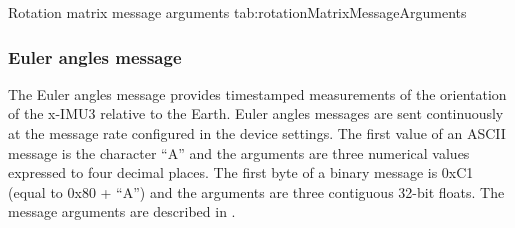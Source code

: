 \begingroup
    \def\tempArgumentA{Rotation matrix XX element}
    \def\tempArgumentB{Rotation matrix XY element}
    \def\tempArgumentC{Rotation matrix XZ element}
    \def\tempArgumentD{Rotation matrix YX element}
    \def\tempArgumentE{Rotation matrix YY element}
    \def\tempArgumentF{Rotation matrix YZ element}
    \def\tempArgumentG{Rotation matrix ZX element}
    \def\tempArgumentH{Rotation matrix ZY element}
    \def\tempArgumentI{Rotation matrix ZZ element}
    \dataMessageTable
    {Rotation matrix message arguments}
    {tab:rotationMatrixMessageArguments}
\endgroup

\begingroup
    \def\tempNameA{Rotation matrix XX element}
    \def\tempNameB{Rotation matrix XY element}
    \def\tempNameC{Rotation matrix XZ element}
    \def\tempNameD{Rotation matrix YX element}
    \def\tempNameE{Rotation matrix YY element}
    \def\tempNameF{Rotation matrix YZ element}
    \def\tempNameG{Rotation matrix ZX element}
    \def\tempNameH{Rotation matrix ZY element}
    \def\tempNameI{Rotation matrix ZZ element}
    \def\tempValueA{1}
    \def\tempValueB{0}
    \def\tempValueC{0}
    \def\tempValueD{0}
    \def\tempValueE{1}
    \def\tempValueF{0}
    \def\tempValueG{0}
    \def\tempValueH{0}
    \def\tempValueI{1}
    \def\tempAsciiFirst{R}
    \def\tempAsciiA{1.0000}
    \def\tempAsciiB{0.0000}
    \def\tempAsciiC{0.0000}
    \def\tempAsciiD{0.0000}
    \def\tempAsciiE{1.0000}
    \def\tempAsciiF{0.0000}
    \def\tempAsciiG{0.0000}
    \def\tempAsciiH{0.0000}
    \def\tempAsciiI{1.\linebreak0000} %
    \def\tempBinaryFirst{D2}
    \def\tempBinaryA{00 00 80 3F}
    \def\tempBinaryB{00 00 00 00}
    \def\tempBinaryC{00 00 00 00}
    \def\tempBinaryD{00 00 00 00}
    \def\tempBinaryE{00 00 80 3F}
    \def\tempBinaryF{00 00 00 00}
    \def\tempBinaryG{00 00 00 00}
    \def\tempBinaryH{00 00 00 00}
    \def\tempBinaryI{00 00 80 3F}
    \dataMessageExample
\endgroup

\subsubsection{Euler angles message}

The Euler angles message provides timestamped measurements of the orientation of the x-IMU3 relative to the Earth.  Euler angles messages are sent continuously at the message rate configured in the device settings.  The first value of an \ac{ASCII} message is the character \enquote{A} and the arguments are three numerical values expressed to four decimal places.  The first byte of a binary message is 0xC1 (equal to 0x80 + \enquote{A}) and the arguments are three contiguous 32-bit floats.  The message arguments are described in .

